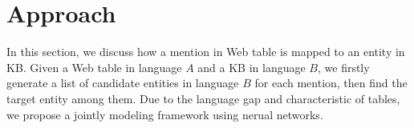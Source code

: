 \section{Approach}
\label{sec:approach}
In this section, we discuss how a mention in Web table is mapped to an entity in KB. Given a Web table in language $A$ and a KB in language $B$, we firstly generate a list of candidate entities in language $B$ for each mention, then find the target entity among them. Due to the language gap and characteristic of tables, we propose a jointly modeling framework using nerual networks.







